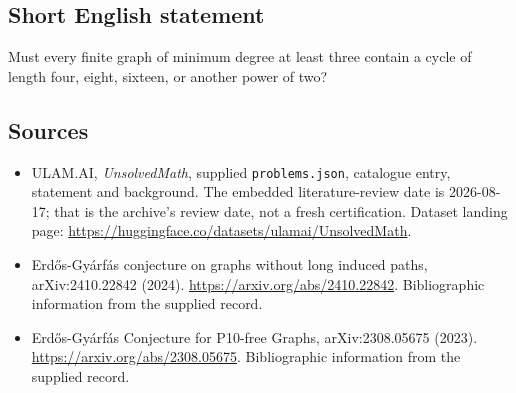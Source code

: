 \documentclass[11pt,a4paper]{article}
\begin{document}
\subsection{Short English statement}

Must every finite graph of minimum degree at least three contain a cycle of length four, eight, sixteen, or another power of two?

\subsection{Sources}

{\small

\begin{itemize}

\item[\hypertarget{source:statement:1}{S1}] ULAM.AI, \emph{UnsolvedMath}, supplied \texttt{problems.json}, catalogue entry, statement and background. The embedded literature-review date is 2026-08-17; that is the archive’s review date, not a fresh certification. Dataset landing page: \url{https://huggingface.co/datasets/ulamai/UnsolvedMath}.

\item[\hypertarget{source:statement:2}{S2}] Erdős-Gyárfás conjecture on graphs without long induced paths, arXiv:2410.22842 (2024). \url{https://arxiv.org/abs/2410.22842}. Bibliographic information from the supplied record.

\item[\hypertarget{source:statement:3}{S3}] Erdős-Gyárfás Conjecture for P10-free Graphs, arXiv:2308.05675 (2023). \url{https://arxiv.org/abs/2308.05675}. Bibliographic information from the supplied record.

\end{itemize}

}

\label{end:statement}
\end{document}
